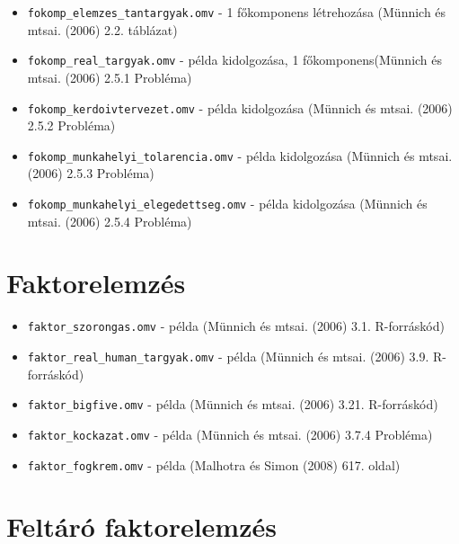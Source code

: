 \documentclass[
  letterpaper,
]{krantz}
\providecommand{\tightlist}{%
  \setlength{\itemsep}{0pt}\setlength{\parskip}{0pt}}\usepackage{longtable,booktabs,array}
\begin{document}
\begin{itemize}
\tightlist
\item
  \texttt{fokomp\_elemzes\_tantargyak.omv} - 1 főkomponens létrehozása
  (Münnich és mtsai. (2006) 2.2. táblázat)
\item
  \texttt{fokomp\_real\_targyak.omv} - példa kidolgozása, 1
  főkomponens(Münnich és mtsai. (2006) 2.5.1 Probléma)
\item
  \texttt{fokomp\_kerdoivtervezet.omv} - példa kidolgozása (Münnich és
  mtsai. (2006) 2.5.2 Probléma)
\item
  \texttt{fokomp\_munkahelyi\_tolarencia.omv} - példa kidolgozása
  (Münnich és mtsai. (2006) 2.5.3 Probléma)
\item
  \texttt{fokomp\_munkahelyi\_elegedettseg.omv} - példa kidolgozása
  (Münnich és mtsai. (2006) 2.5.4 Probléma)
\end{itemize}

\hypertarget{faktorelemzuxe9s}{%
\section{Faktorelemzés}\label{faktorelemzuxe9s}}

\begin{itemize}
\tightlist
\item
  \texttt{faktor\_szorongas.omv} - példa (Münnich és mtsai. (2006) 3.1.
  R-forráskód)
\item
  \texttt{faktor\_real\_human\_targyak.omv} - példa (Münnich és mtsai.
  (2006) 3.9. R-forráskód)
\item
  \texttt{faktor\_bigfive.omv} - példa (Münnich és mtsai. (2006) 3.21.
  R-forráskód)
\item
  \texttt{faktor\_kockazat.omv} - példa (Münnich és mtsai. (2006) 3.7.4
  Probléma)
\item
  \texttt{faktor\_fogkrem.omv} - példa (Malhotra és Simon (2008) 617.
  oldal)
\end{itemize}

\hypertarget{feltuxe1ruxf3-faktorelemzuxe9s}{%
\section{Feltáró faktorelemzés}\label{feltuxe1ruxf3-faktorelemzuxe9s}}
\end{document}
